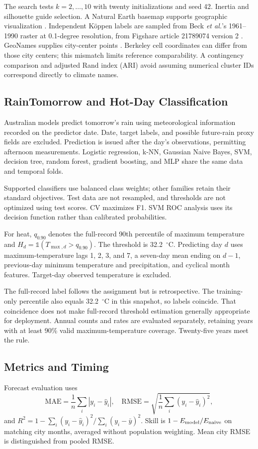 \documentclass[conference]{IEEEtran}
\begin{document}
The search tests $k=2,\ldots,10$ with twenty initializations and seed 42. Inertia and silhouette guide selection. A Natural Earth basemap supports geographic visualization \cite{naturalearth}. Independent K\"oppen labels are sampled from Beck \emph{et al.}'s 1961--1990 raster at 0.1-degree resolution, from Figshare article 21789074 version 2 \cite{beck2023}. GeoNames supplies city-center points \cite{geonames}. Berkeley cell coordinates can differ from those city centers; this mismatch limits reference comparability. A contingency comparison and adjusted Rand index (ARI) avoid assuming numerical cluster IDs correspond directly to climate names.

\subsection{RainTomorrow and Hot-Day Classification}
Australian models predict tomorrow's rain using meteorological information recorded on the predictor date. Date, target labels, and possible future-rain proxy fields are excluded. Prediction is issued after the day's observations, permitting afternoon measurements. Logistic regression, k-NN, Gaussian Naive Bayes, SVM, decision tree, random forest, gradient boosting, and MLP share the same data and temporal folds.

Supported classifiers use balanced class weights; other families retain their standard objectives. Test data are not resampled, and thresholds are not optimized using test scores. CV maximizes F1. SVM ROC analysis uses its decision function rather than calibrated probabilities.

For heat, $q_{0.90}$ denotes the full-record 90th percentile of maximum temperature and $H_d=\mathbb{1}(T_{\max,d}>q_{0.90})$. The threshold is 32.2~$^\circ$C. Predicting day $d$ uses maximum-temperature lags 1, 2, 3, and 7, a seven-day mean ending on $d-1$, previous-day minimum temperature and precipitation, and cyclical month features. Target-day observed temperature is excluded.

The full-record label follows the assignment but is retrospective. The training-only percentile also equals 32.2~$^\circ$C in this snapshot, so labels coincide. That coincidence does not make full-record threshold estimation generally appropriate for deployment. Annual counts and rates are evaluated separately, retaining years with at least 90\% valid maximum-temperature coverage. Twenty-five years meet the rule.

\subsection{Metrics and Timing}
Forecast evaluation uses
\begin{equation}\mathrm{MAE}=\frac1n\sum_i|y_i-\hat y_i|,\quad\mathrm{RMSE}=\sqrt{\frac1n\sum_i(y_i-\hat y_i)^2},\end{equation}
and $R^2=1-\sum_i(y_i-\hat y_i)^2/\sum_i(y_i-\bar y)^2$. Skill is $1-E_{\rm model}/E_{\rm naive}$ on matching city months, averaged without population weighting. Mean city RMSE is distinguished from pooled RMSE.
\end{document}
